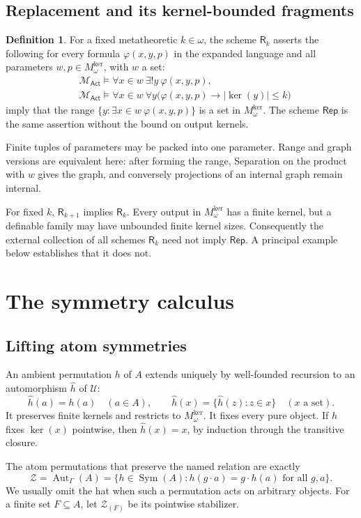\documentclass[11pt,letterpaper]{article}
\theoremstyle{definition}
\newtheorem{definition}[definition]{Definition}\aliascntresetthe{definition}
\theoremstyle{remark}
\newcommand{\Aut}{\operatorname{Aut}}
\newcommand{\kerat}{\operatorname{ker}}
\newcommand{\Mker}{M^{\mathrm{ker}}}
\newcommand{\Uk}{\mathcal U}
\newcommand{\Sym}{\operatorname{Sym}}
\newcommand{\Act}{\mathsf{Act}}
\newcommand{\MAct}{\mathcal M_{\Act}}
\newcommand{\Rep}{\mathsf{Rep}}
\newcommand{\abs}[1]{\lvert #1\rvert}
\begin{document}
\subsection{Replacement and its kernel-bounded fragments}
\begin{definition}\label{hset:ns:def:Rk}
For a fixed metatheoretic $k\in\omega$, the scheme $\mathsf R_k$ asserts the following for every formula $\varphi(x,y,p)$ in the expanded language and all parameters $w,p\in \Mker_\omega$, with $w$ a set:
\begin{align*}
 &\MAct\models\forall x\in w\ \exists!y\ \varphi(x,y,p),\\
 &\MAct\models\forall x\in w\ \forall y\bigl(\varphi(x,y,p)\to\abs{\kerat(y)}\le k\bigr)
\end{align*}
imply that the range $\{y:\exists x\in w\ \varphi(x,y,p)\}$ is a set in $\Mker_\omega$. The scheme $\Rep$ is the same assertion without the bound on output kernels.
\end{definition}
Finite tuples of parameters may be packed into one parameter. Range and graph versions are equivalent here: after forming the range, Separation on the product with $w$ gives the graph, and conversely projections of an internal graph remain internal.

For fixed $k$, $\mathsf R_{k+1}$ implies $\mathsf R_k$. Every output in $\Mker_\omega$ has a finite kernel, but a definable family may have unbounded finite kernel sizes. Consequently the external collection of all schemes $\mathsf R_k$ need not imply $\Rep$. A principal example below establishes that it does not.

\section{The symmetry calculus}
\label{hset:ns:sec:symmetry}

\subsection{Lifting atom symmetries}
An ambient permutation $h$ of $A$ extends uniquely by well-founded recursion to an automorphism $\widehat h$ of $\Uk$:
\[
 \widehat h(a)=h(a)\quad(a\in A),\qquad
 \widehat h(x)=\{\widehat h(z):z\in x\}\quad(x\text{ a set}).
\]
It preserves finite kernels and restricts to $\Mker_\omega$. It fixes every pure object. If $h$ fixes $\kerat(x)$ pointwise, then $\widehat h(x)=x$, by induction through the transitive closure.

The atom permutations that preserve the named relation are exactly
\[
 \mathcal Z=\Aut_\Gamma(A)
 =\{h\in\Sym(A):h(g\cdot a)=g\cdot h(a)\text{ for all }g,a\}.
\]
We usually omit the hat when such a permutation acts on arbitrary objects. For a finite set $F\subseteq A$, let $\mathcal Z_{(F)}$ be its pointwise stabilizer.
\end{document}
